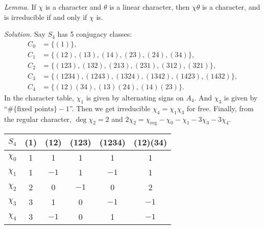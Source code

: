 \documentclass{mathproblems}
\begin{document}
\begin{questions}
{\textit{Lemma.} If $\chi$ is a character and $\theta$ is a linear character, then $\chi\theta$ is a character, and is irreducible if and only if $\chi$ is.
}

\textit{Solution.} Say $S_4$ has 5 conjugacy classes:
$$
\begin{aligned}
C_0&=\{(1)\},\\
C_1&=\{(12),(13),(14),(23),(24),(34)\},\\
C_2&=\{(123),(132),(213),(231),(312),(321)\},\\
C_3&=\{(1234),(1243),(1324),(1342),(1423),(1432)\},\\
C_4&=\{(12)(34),(13)(24),(14)(23)\}.
\end{aligned}
$$
In the character table, $\chi_1$ is given by alternating signs on $A_4$. And $\chi_3$ is given by ``$\#\{\text{fixed points}\}-1$''. Then we get irreducible $\chi_4=\chi_1\chi_3$ for free. Finally, from the regular character, $\deg \chi_2=2$ and $2\chi_2=\chi_{\mathrm{reg}}-\chi_0-\chi_1-3\chi_3-3\chi_4$.
\begin{center}
\begin{tabular}{c|ccccc}
$S_4$ & (1) & (12) & (123) & (1234) & (12)(34)\\
\hline
$\chi_0$ & 1 & 1 & 1 & 1 & 1 \\
$\chi_1$ & 1 & $-1$ & 1 & $-1$ & 1 \\
$\chi_2$ & 2 & 0 & $-1$ & 0 & 2 \\
$\chi_3$ & 3 & 1 & 0 & $-1$ & $-1$ \\
$\chi_4$ & 3 & $-1$ & 0 & 1 & $-1$ \\
\end{tabular}
\end{center}



\end{questions}
\end{document}
